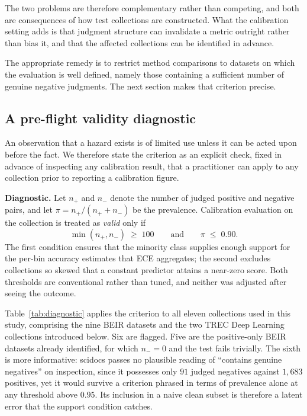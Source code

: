 \documentclass[sn-mathphys-num,pdflatex]{sn-jnl}
\begin{document}
The two problems are therefore complementary rather than competing, and both are
consequences of how test collections are constructed. What the calibration setting
adds is that judgment structure can invalidate a metric outright rather than bias
it, and that the affected collections can be identified in advance.

\smallskip
The appropriate remedy is to restrict method comparisons to datasets on which the
evaluation is well defined, namely those containing a sufficient number of genuine
negative judgments. The next section makes that criterion precise.

\subsection{A pre-flight validity diagnostic}\label{sec:diagnostic}
An observation that a hazard exists is of limited use unless it can be acted upon
before the fact. We therefore state the criterion as an explicit check, fixed in
advance of inspecting any calibration result, that a practitioner can apply to any
collection prior to reporting a calibration figure.

\smallskip
\noindent\textbf{Diagnostic.} Let $n_{+}$ and $n_{-}$ denote the number of judged
positive and negative pairs, and let $\pi = n_{+}/(n_{+}+n_{-})$ be the prevalence.
Calibration evaluation on the collection is treated as \emph{valid} only if
\begin{equation}
\min(n_{+}, n_{-}) \;\geq\; 100
\qquad\text{and}\qquad
\pi \;\leq\; 0.90 .
\label{eq:diagnostic}
\end{equation}
The first condition ensures that the minority class supplies enough support for the
per-bin accuracy estimates that ECE aggregates; the second excludes collections so
skewed that a constant predictor attains a near-zero score. Both thresholds are
conventional rather than tuned, and neither was adjusted after seeing the outcome.

Table~\ref{tab:diagnostic} applies the criterion to all eleven collections used in
this study, comprising the nine BEIR datasets and the two TREC Deep Learning
collections introduced below. Six are flagged. Five are the positive-only BEIR
datasets already identified, for which $n_{-}=0$ and the test fails trivially. The sixth is more informative: scidocs
passes no plausible reading of ``contains genuine negatives'' on inspection, since
it possesses only $91$ judged negatives against $1{,}683$ positives, yet it would
survive a criterion phrased in terms of prevalence alone at any threshold above
$0.95$. Its inclusion in a naive clean subset is therefore a latent error that the
support condition catches.
\end{document}
